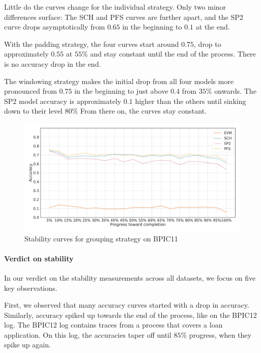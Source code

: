 Little do the curves change for the individual strategy.
Only two minor differences surface: The SCH and PFS curves are further apart, and the SP2 curve drops asymptotically from $0.65$ in the beginning to $0.1$ at the end.

With the padding strategy, the four curves start around $0.75$, drop to approximately $0.55$ at $55\%$ and stay constant until the end of the process.
There is no accuracy drop in the end.

The windowing strategy makes the initial drop from all four models more pronounced from $0.75$ in the beginning to just above $0.4$ from $35\%$ onwards.
The SP2 model accuracy is approximately $0.1$ higher than the others until sinking down to their level $80\%$
From there on, the curves stay constant.

\begin{figure}[!htb]
    \centering
    \includegraphics[width=\textwidth]{gfx/bpic2011/grouped_stability.pdf}
    \caption{Stability curves for grouping strategy on BPIC11}
    \label{fig:bpic11-grouped-stability}
\end{figure}

\paragraph{Verdict on stability}
In our verdict on the stability measurements across all datasets, we focus on five key observations.

First, we observed that many accuracy curves started with a drop in accuracy.
Similarly, accuracy spiked up towards the end of the process, like on the BPIC12 log.
The BPIC12 log contains traces from a process that covers a loan application.
On this log, the accuracies taper off until $85\%$ progress, when they spike up again.

